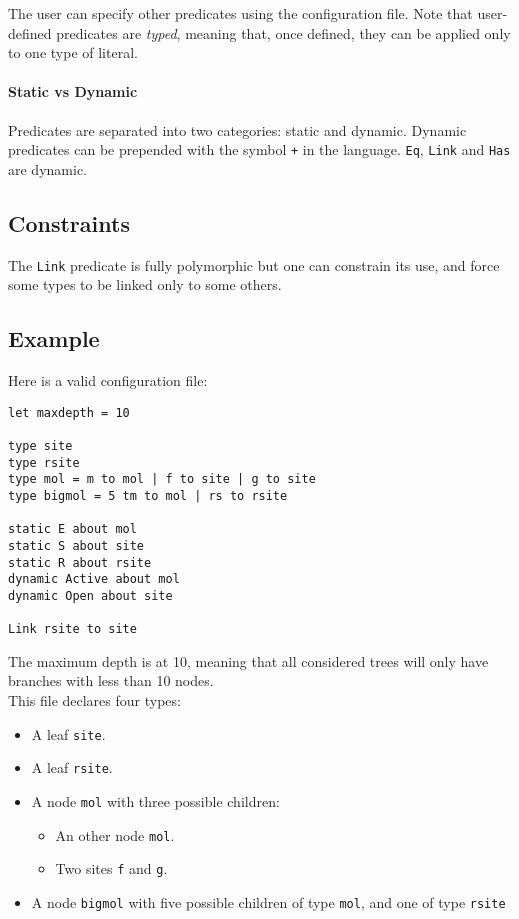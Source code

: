 \documentclass[10pt,a4paper]{article}
\newcommand{\ocaml}{\texttt}
\begin{document}
The user can specify other predicates using the configuration file. Note that user-defined predicates are \emph{typed}, meaning that, once defined, they can be applied only to one type of literal.

\paragraph{Static vs Dynamic}
Predicates are separated into two categories: static and dynamic. Dynamic predicates can be prepended with the symbol \ocaml{+} in the language. \ocaml{Eq}, \ocaml{Link} and \ocaml{Has} are dynamic.

\subsection{Constraints}
The \ocaml{Link} predicate is fully polymorphic but one can constrain its use, and force some types to be linked only to some others.

\subsection{Example}
Here is a valid configuration file:
\begin{verbatim}
let maxdepth = 10

type site
type rsite
type mol = m to mol | f to site | g to site
type bigmol = 5 tm to mol | rs to rsite

static E about mol
static S about site
static R about rsite
dynamic Active about mol
dynamic Open about site

Link rsite to site
\end{verbatim}
The maximum depth is at 10, meaning that all considered trees will only have branches with less than 10 nodes.\\

This file declares four types:

\begin{itemize}
\item A leaf \ocaml{site}.
\item A leaf \ocaml{rsite}.
\item A node \ocaml{mol} with three possible children:
  \begin{itemize}
  \item An other node \ocaml{mol}.
  \item Two sites \ocaml{f} and \ocaml{g}.
  \end{itemize}
\item A node \ocaml{bigmol} with five possible children of type \ocaml{mol}, and one of type \ocaml{rsite}
\end{itemize}
\end{document}
